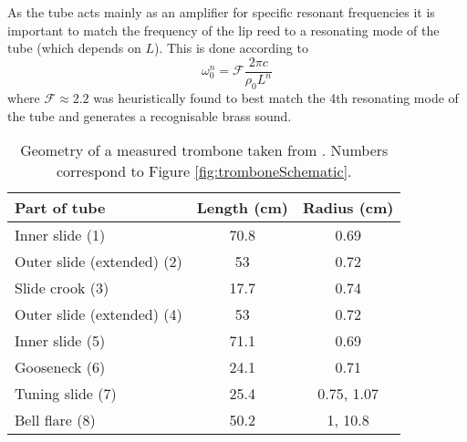 As the tube acts mainly as an amplifier for specific resonant frequencies it is important to match the frequency of the lip reed to a resonating mode of the tube (which depends on $L$). This is done according to
\begin{equation}
    \omega_0^n = \mathcal{F}\frac{2\pi c}{\rho_0 L^n}
\end{equation}
where $\mathcal{F} \approx 2.2$  was heuristically found to best match the 4th resonating mode of the tube and generates a recognisable brass sound.
\begin{table}[t]
    \small
    \begin{center}
    \begin{tabular}{|l|c|c|}
        \hline
        Part of tube & Length (cm) & Radius (cm)\\\hline
        Inner slide (1) & 70.8 & 0.69\\
        Outer slide (extended) (2) & 53 & 0.72 
        \\
        Slide crook (3)& 17.7 & 0.74\\
        Outer slide (extended) (4) & 53 & 0.72 
        \\
        Inner slide (5) & 71.1 & 0.69\\
        Gooseneck (6) & 24.1 & 0.71\\
        Tuning slide (7) & 25.4 & 0.75, 1.07\\
        Bell flare (8) & 50.2& 1, 10.8\\\hline
    \end{tabular}
    \caption{Geometry of a measured trombone taken from \cite{Smyth2011}. Numbers correspond to Figure \ref{fig:tromboneSchematic}.\label{tab:geometry}}
    \end{center}
\end{table}



